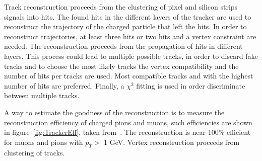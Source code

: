 Track reconstruction proceeds from the clustering of pixel and silicon strips signals into hits. The found hits in the different layers of the tracker are used to reconstruct the trajectory of the charged particle that left the hits. In order to reconstruct trajectories, at least three hits or two hits and a vertex constraint are needed. The reconstruction proceeds from the propagation of hits in different layers. This process could lead to multiple possible tracks, in order to discard fake tracks and to choose the most likely tracks the vertex compatibility and the number of hits per tracks are used. Most compatible tracks and with the highest number of hits are preferred. Finally, a $\chi^{2}$ fitting is used in order discriminate between multiple tracks. 

A way to estimate the goodness of the reconstruction is to measure the reconstruction efficiency of charged pions and muons, such efficiencies are shown in figure~\ref{fig:TrackerEff}, taken from~\cite{Chatrchyan:2014fea}. The reconstruction is near 100\% efficient for muons and pions with $p_{T}>$ 1 GeV. Vertex reconstruction proceeds from clustering of tracks.

